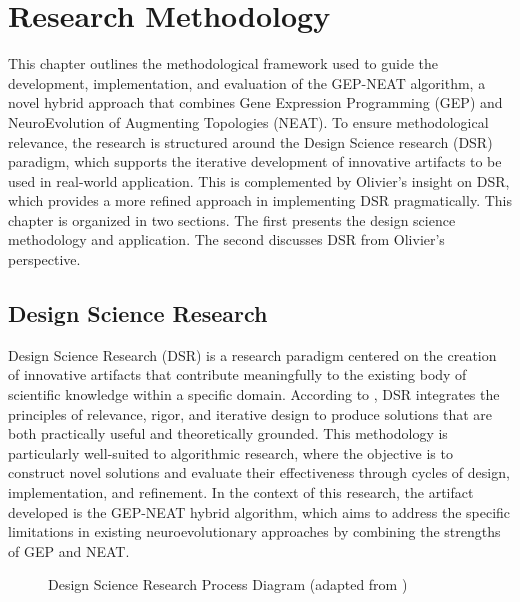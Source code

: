 \chapter{Research Methodology}
This chapter outlines the methodological framework used to guide the development, implementation, and evaluation of the GEP-NEAT algorithm, a novel hybrid approach that combines Gene Expression Programming (GEP) and NeuroEvolution of Augmenting Topologies (NEAT). To ensure methodological relevance, the research is structured around the Design Science research (DSR) paradigm, which supports the iterative development of innovative artifacts to be used in real-world application. This is complemented by Olivier's insight on DSR, which provides a more refined approach in implementing DSR pragmatically. This chapter is organized in two sections. The first presents the design science methodology and application. The second discusses DSR from Olivier's perspective.

\section{Design Science Research}
Design Science Research (DSR) is a research paradigm centered on the creation of innovative artifacts that contribute meaningfully to the existing body of scientific knowledge within a specific domain. According to \cite{hevner2004design}, DSR integrates the principles of relevance, rigor, and iterative design to produce solutions that are both practically useful and theoretically grounded. This methodology is particularly well-suited to algorithmic research, where the objective is to construct novel solutions and evaluate their effectiveness through cycles of design, implementation, and refinement. In the context of this research, the artifact developed is the GEP-NEAT hybrid algorithm, which aims to address the specific limitations in existing neuroevolutionary approaches by combining the strengths of GEP and NEAT.

\parbreak
\begin{figure}[H] %
	\centering %
	\caption{Design Science Research Process Diagram (adapted from \cite{hevner2004design})}
	\label{fig:dsr} %
\end{figure}

